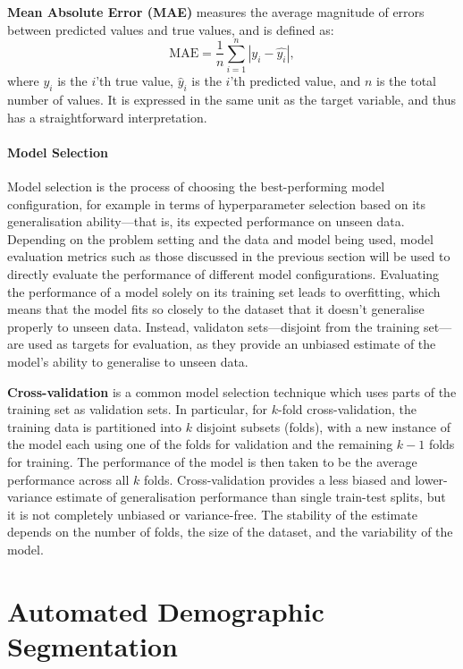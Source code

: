 \documentclass{report}
\begin{document}
\textbf{Mean Absolute Error (MAE)} measures the average magnitude of errors between predicted values and true values\cite{shaun2025principles}, and is defined as:
\begin{equation}
\text{MAE} = \frac{1}{n} \sum_{i=1}^n | y_i - \hat{y_i} |,
\end{equation}
where $y_i$ is the $i$'th true value, $\hat y_i$ is the $i$'th predicted value, and $n$ is the total number of values. It is expressed in the same unit as the target variable, and thus has a straightforward interpretation.

\subsubsection{Model Selection}

Model selection is the process of choosing the best-performing model configuration, for example in terms of hyperparameter selection based on its generalisation ability—that is, its expected performance on unseen data\cite{bishop2006pattern}. Depending on the problem setting and the data and model being used, model evaluation metrics such as those discussed in the previous section will be used to directly evaluate the performance of different model configurations. Evaluating the performance of a model solely on its training set leads to overfitting, which means that the model fits so closely to the dataset that it doesn't generalise properly to unseen data. Instead, validaton sets—disjoint from the training set—are used as targets for evaluation, as they provide an unbiased estimate of the model's ability to generalise to unseen data.

\textbf{Cross-validation} is a common model selection technique which uses parts of the training set as validation sets\cite{bishop2006pattern}. In particular, for $k$-fold cross-validation, the training data is partitioned into $k$ disjoint subsets (folds), with a new instance of the model each using one of the folds for validation and the remaining $k-1$ folds for training. The performance of the model is then taken to be the average performance across all $k$ folds. Cross-validation provides a less biased and lower-variance estimate of generalisation performance than single train-test splits, but it is not completely unbiased or variance-free. The stability of the estimate depends on the number of folds, the size of the dataset, and the variability of the model.


\chapter{Automated Demographic Segmentation}
\end{document}

